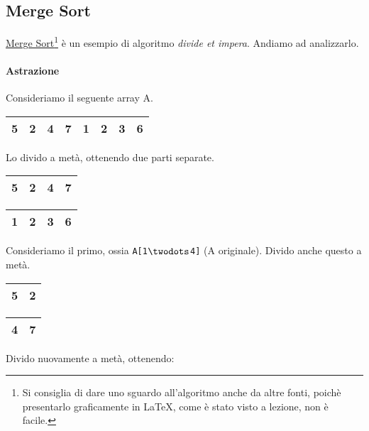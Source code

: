 \subsection{Merge Sort} \label{mergesort}
\href{https://en.wikipedia.org/wiki/Merge_sort}{Merge Sort}\footnote{Si %
consiglia di dare uno sguardo all'algoritmo anche da altre fonti, poichè presentarlo %
graficamente in \LaTeX, come è stato visto a lezione, non è facile.} è un 
esempio di algoritmo \emph{divide et impera}. Andiamo ad analizzarlo.

\paragraph{Astrazione} Consideriamo il seguente array A.
\begin{center}
	\begin{tabular}{|l|l|l|l||l|l|l|l|}
		\hline
		5 & 2 & 4 & 7 & 1 & 2 & 3 & 6 \\
		\hline
	\end{tabular}
\end{center}

Lo divido a metà, ottenendo due parti separate.

\begin{center}
	\begin{tabular}{|l|l|l|l|}
		\hline
		5 & 2 & 4 & 7 \\
		\hline
	\end{tabular}
	\hspace{1cm}
	\begin{tabular}{|l|l|l|l|}
		\hline
		1 & 2 & 3 & 6 \\
		\hline
	\end{tabular}
\end{center}

Consideriamo il primo, ossia \texttt{A[1$\twodots$4]} (A originale). Divido anche questo a metà.

\begin{center}
	\begin{tabular}{|l|l|}
		\hline
		5 & 2 \\
		\hline
	\end{tabular}
	\hspace{1cm}
	\begin{tabular}{|l|l|}
		\hline
		4 & 7 \\
		\hline
	\end{tabular}
\end{center}

Divido nuovamente a metà, ottenendo:

